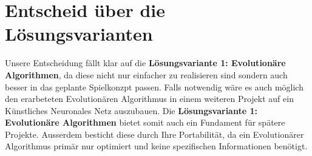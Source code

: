 \section{Entscheid über die Lösungsvarianten}
Unsere Entscheidung fällt klar auf die \textbf{Lösungsvariante 1: Evolutionäre Algorithmen}, da diese nicht nur einfacher zu realisieren sind sondern auch besser in das geplante Spielkonzpt passen. Falls notwendig wäre es auch möglich den erarbeteten Evolutionären Algorithmus in einem weiteren Projekt auf ein Künstliches Neuronales Netz auszubauen. Die \textbf{Lösungsvariante 1: Evolutionäre Algorithmen} bietet somit auch ein Fundament für spätere Projekte. Ausserdem besticht diese durch Ihre Portabilität, da ein Evolutionärer Algorithmus primär nur optimiert und keine spezifischen Informationen benötigt.